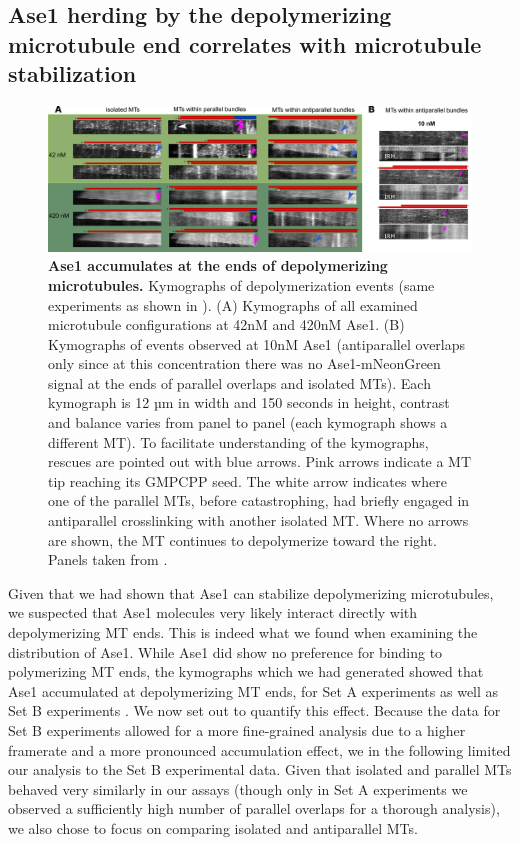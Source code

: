 \subsection{Ase1 herding by the depolymerizing microtubule end correlates with microtubule stabilization}
\label{sec:ase12}
\begin{figure}[h]
    \centering
    \includegraphics[width=1\linewidth]{Figures/ase2a.png}
    \caption[Ase1 accumulates at the ends of depolymerizing microtubules.]{\textbf{Ase1 accumulates at the ends of depolymerizing microtubules.} Kymographs of depolymerization events (same experiments as shown in ). (A) Kymographs of all examined microtubule configurations at 42nM and 420nM Ase1. (B) Kymographs of events observed at 10nM Ase1 (antiparallel overlaps only since at this concentration there was no Ase1-mNeonGreen signal at the ends of parallel overlaps and isolated MTs). Each kymograph is 12 µm in width and 150 seconds in height, contrast and balance varies from panel to panel (each kymograph shows a different MT). To facilitate understanding of the kymographs, rescues are pointed out with blue arrows. Pink arrows indicate a MT tip reaching its GMPCPP seed. The white arrow indicates where one of the parallel MTs, before catastrophing, had briefly engaged in antiparallel crosslinking with another isolated MT. Where no arrows are shown, the MT continues to depolymerize toward the right. Panels taken from \cite{Krattenmacher2024}.
        }\label{ase2a}
\end{figure}
Given that we had shown that Ase1 can stabilize depolymerizing microtubules, we suspected that Ase1 molecules very likely interact directly with depolymerizing MT ends. This is indeed what we found when examining the distribution of Ase1. While Ase1 did show no preference for binding to polymerizing MT ends, the kymographs which we had generated showed that Ase1 accumulated at depolymerizing MT ends, for Set A experiments  as well as Set B experiments . We now set out to quantify this effect. Because the data for Set B experiments allowed for a more fine-grained analysis due to a higher framerate and a more pronounced accumulation effect, we in the following limited our analysis to the Set B experimental data. Given that isolated and parallel MTs behaved very similarly in our assays (though only in Set A experiments we observed a sufficiently high number of parallel overlaps for a thorough analysis), we also chose to focus on comparing isolated and antiparallel MTs.\par

